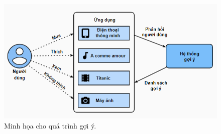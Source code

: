 \begin{center}
    \begin{figure}[H]
    \begin{center}
     \includegraphics[scale=.8]{images/Screenshot 2022-07-17 172951.png}
    \end{center}
    \caption{Minh họa cho quá trình gợi ý.}
    \label{refhinh1}
    \end{figure}
\end{center}

